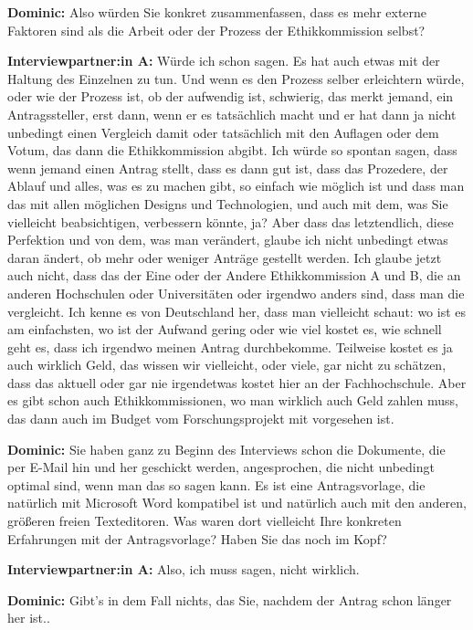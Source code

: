 \documentclass[a4paper,12pt,twoside]{scrreprt}
\begin{document}
\textbf{Dominic:} Also würden Sie konkret zusammenfassen, dass es mehr externe Faktoren sind als die Arbeit oder der Prozess der Ethikkommission selbst?

\textbf{Interviewpartner:in A:} Würde ich schon sagen. Es hat auch etwas mit der Haltung des Einzelnen zu tun. Und wenn es den Prozess selber erleichtern würde, oder wie der Prozess ist, ob der aufwendig ist, schwierig, das merkt jemand, ein Antragssteller, erst dann, wenn er es tatsächlich macht und er hat dann ja nicht unbedingt einen Vergleich damit oder tatsächlich mit den Auflagen oder dem Votum, das dann die Ethikkommission abgibt. Ich würde so spontan sagen, dass wenn jemand einen Antrag stellt, dass es dann gut ist, dass das Prozedere, der Ablauf und alles, was es zu machen gibt, so einfach wie möglich ist und dass man das mit allen möglichen Designs und Technologien, und auch mit dem, was Sie vielleicht beabsichtigen, verbessern könnte, ja? Aber dass das letztendlich, diese Perfektion und von dem, was man verändert, glaube ich nicht unbedingt etwas daran ändert, ob mehr oder weniger Anträge gestellt werden. Ich glaube jetzt auch nicht, dass das der Eine oder der Andere Ethikkommission A und B, die an anderen Hochschulen oder Universitäten oder irgendwo anders sind, dass man die vergleicht. Ich kenne es von Deutschland her, dass man vielleicht schaut: wo ist es am einfachsten, wo ist der Aufwand gering oder wie viel kostet es, wie schnell geht es, dass ich irgendwo meinen Antrag durchbekomme. Teilweise kostet es ja auch wirklich Geld, das wissen wir vielleicht, oder viele, gar nicht zu schätzen, dass das aktuell oder gar nie irgendetwas kostet hier an der Fachhochschule. Aber es gibt schon auch Ethikkommissionen, wo man wirklich auch Geld zahlen muss, das dann auch im Budget vom Forschungsprojekt mit vorgesehen ist.

\textbf{Dominic:} Sie haben ganz zu Beginn des Interviews schon die Dokumente, die per E-Mail hin und her geschickt werden, angesprochen, die nicht unbedingt optimal sind, wenn man das so sagen kann. Es ist eine Antragsvorlage, die natürlich mit Microsoft Word kompatibel ist und natürlich auch mit den anderen, größeren freien Texteditoren. Was waren dort vielleicht Ihre konkreten Erfahrungen mit der Antragsvorlage? Haben Sie das noch im Kopf?

\textbf{Interviewpartner:in A:} Also, ich muss sagen, nicht wirklich.

\textbf{Dominic:} Gibt’s in dem Fall nichts, das Sie, nachdem der Antrag schon länger her ist..
\end{document}
